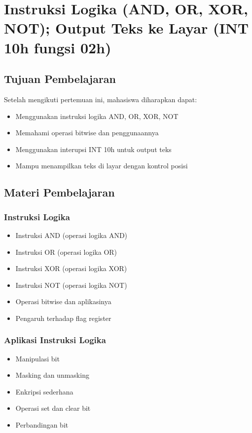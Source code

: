 \chapter{Instruksi Logika (AND, OR, XOR, NOT); Output Teks ke Layar (INT 10h fungsi 02h)}

\section{Tujuan Pembelajaran}
Setelah mengikuti pertemuan ini, mahasiswa diharapkan dapat:
\begin{itemize}
\item Menggunakan instruksi logika AND, OR, XOR, NOT
\item Memahami operasi bitwise dan penggunaannya
\item Menggunakan interupsi INT 10h untuk output teks
\item Mampu menampilkan teks di layar dengan kontrol posisi
\end{itemize}

\section{Materi Pembelajaran}

\subsection{Instruksi Logika}
\begin{itemize}
\item Instruksi AND (operasi logika AND)
\item Instruksi OR (operasi logika OR)
\item Instruksi XOR (operasi logika XOR)
\item Instruksi NOT (operasi logika NOT)
\item Operasi bitwise dan aplikasinya
\item Pengaruh terhadap flag register
\end{itemize}

\subsection{Aplikasi Instruksi Logika}
\begin{itemize}
\item Manipulasi bit
\item Masking dan unmasking
\item Enkripsi sederhana
\item Operasi set dan clear bit
\item Perbandingan bit
\end{itemize}

